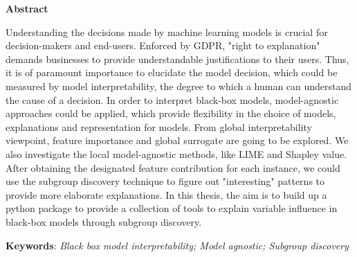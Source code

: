 \thispagestyle{plain}
\vspace*{\fill}
\begin{center}
	\Large
	\textbf{Abstract}
\end{center}

\vspace{1cm}
Understanding the decisions made by machine learning models is crucial for decision-makers and end-users. Enforced by GDPR, "right to explanation" demands businesses to provide understandable justifications to their users. Thus, it is of paramount importance to elucidate the model decision, which could be measured by model interpretability, the degree to which a human can understand the cause of a decision. In order to interpret black-box models, model-agnostic approaches could be applied, which provide flexibility in the choice of models, explanations and representation for models. From global interpretability viewpoint, feature importance and global surrogate are going to be explored. We also investigate the local model-agnostic methods, like LIME and Shapley value. After obtaining the designated feature contribution for each instance, we could use the subgroup discovery technique to figure out "interesting" patterns to provide more elaborate explanations. In this thesis, the aim is to build up a python package to provide a collection of tools to explain variable influence in black-box models through subgroup discovery. 


	\textbf{Keywords}: \textit{Black box model interpretability; Model agnostic; Subgroup discovery}

\vspace*{\fill}